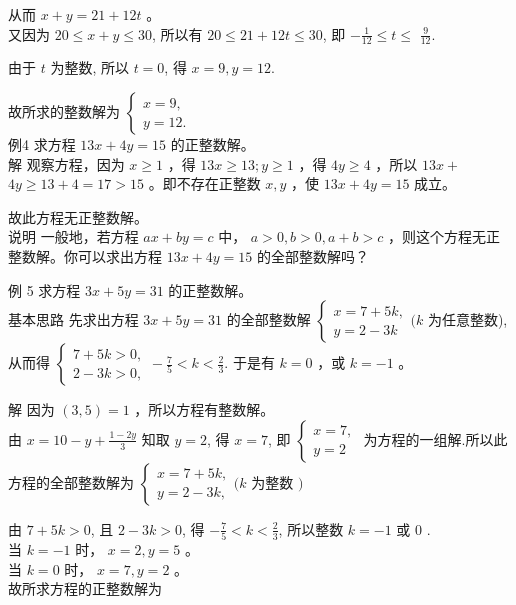\documentclass[10pt]{article}
\begin{document}
从而 $x+y=21+12 t$ 。\\
又因为 $20 \leqslant x+y \leqslant 30$, 所以有 $20 \leqslant 21+12 t \leqslant 30$, 即 $-\frac{1}{12} \leqslant t \leqslant$ $\frac{9}{12}$.

由于 $t$ 为整数, 所以 $t=0$, 得 $x=9, y=12$.

故所求的整数解为 $\left\{\begin{array}{l}x=9, \\ y=12 .\end{array}\right.$\\
例4 求方程 $13 x+4 y=15$ 的正整数解。\\
解 观察方程，因为 $x \geqslant 1$ ，得 $13 x \geqslant 13 ; y \geqslant 1$ ，得 $4 y \geqslant 4$ ，所以 $13 x+$ $4 y \geqslant 13+4=17>15$ 。即不存在正整数 $x, y$ ，使 $13 x+4 y=15$ 成立。

故此方程无正整数解。\\
说明 一般地，若方程 $a x+b y=c$ 中， $a>0, b>0, a+b>c$ ，则这个方程无正整数解。你可以求出方程 $13 x+4 y=15$ 的全部整数解吗？

例 5 求方程 $3 x+5 y=31$ 的正整数解。\\
基本思路 先求出方程 $3 x+5 y=31$ 的全部整数解 $\left\{\begin{array}{l}x=7+5 k, \\ y=2-3 k\end{array}(k\right.$ 为任意整数), 从而得 $\left\{\begin{array}{l}7+5 k>0, \\ 2-3 k>0,\end{array}-\frac{7}{5}<k<\frac{2}{3}\right.$. 于是有 $k=0$ ，或 $k=-1$ 。

解 因为 $(3,5)=1$ ，所以方程有整数解。\\
由 $x=10-y+\frac{1-2 y}{3}$ 知取 $y=2$, 得 $x=7$, 即 $\left\{\begin{array}{l}x=7, \\ y=2\end{array}\right.$ 为方程的一组解.所以此方程的全部整数解为 $\left\{\begin{array}{l}x=7+5 k, \\ y=2-3 k,\end{array}(k\right.$ 为整数 $)$

由 $7+5 k>0$, 且 $2-3 k>0$, 得 $-\frac{7}{5}<k<\frac{2}{3}$, 所以整数 $k=-1$ 或 0 .\\
当 $k=-1$ 时， $x=2, y=5$ 。\\
当 $k=0$ 时， $x=7, y=2$ 。\\
故所求方程的正整数解为
\end{document}
